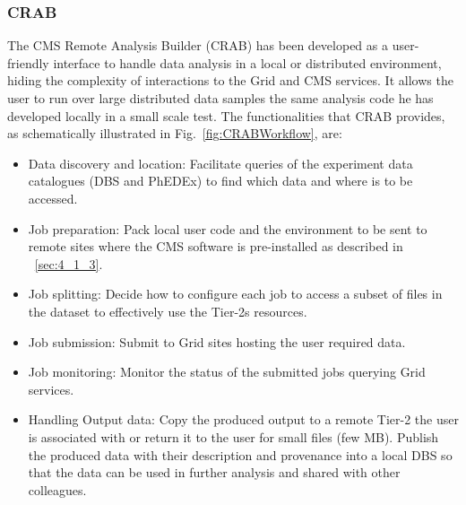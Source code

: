 %
\label{sec:3_2}
\subsubsection{CRAB}
\label{sec:CRAB}
The CMS Remote Analysis Builder (CRAB)\cite{RefCRAB} has been developed as a user-friendly interface to handle data analysis in a local or distributed environment, hiding the complexity of interactions to the Grid and CMS services.
It allows the user to run over large distributed data samples the same 
analysis code he has developed locally in a small scale test. 
The functionalities that CRAB provides, as schematically illustrated in Fig.~\ref{fig:CRABWorkflow}, are:
\begin{itemize}
\item{Data discovery and location:}
Facilitate queries of the experiment data catalogues (DBS and PhEDEx) to find which data and where is to be accessed.
\item{Job preparation:}
Pack local user code and the environment to be sent to remote sites where the CMS software is pre-installed as described in ~\ref{sec:4_1_3}.
\item{Job splitting:}
Decide how to configure each job to access a subset of files in the dataset to effectively use the Tier-2s resources.
\item{Job submission:}
Submit to Grid sites hosting the user required data.
\item{Job monitoring:}
Monitor the status of the submitted jobs querying Grid services.
\item{Handling Output data:}
Copy the produced output to a remote Tier-2 the user is associated with or return it to the user for small files (few MB).
Publish the produced data with their description and provenance into a local DBS so that the data can be used in further analysis and shared with other colleagues.
\end{itemize} 

